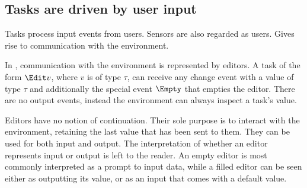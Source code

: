 \subsection{Tasks are driven by user input}

Tasks process input events from users.
Sensors are also regarded as users.
Gives rise to communication with the environment.

In \TOPHAT, communication with the environment is represented by editors.
A task of the form $\Edit v$, where $v$ is of type $\tau$, can receive any change event with a value of type $\tau$ and additionally the special event $\Empty$ that empties the editor.
There are no output events, instead the environment can always inspect a task's value.

Editors have no notion of continuation.
Their sole purpose is to interact with the environment, retaining the last value that has been sent to them.
%
They can be used for both input and output.
The interpretation of whether an editor represents input or output is left to the reader.
An empty editor is most commonly interpreted as a prompt to input data, while a filled editor can be seen either as outputting its value, or as an input that comes with a default value.


